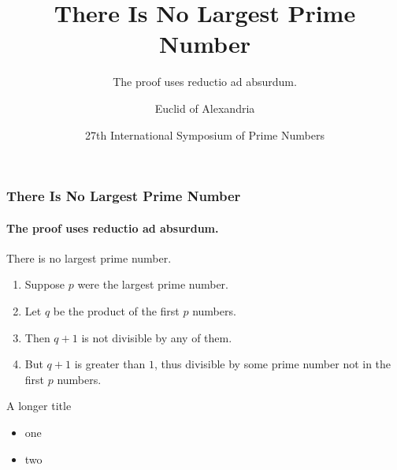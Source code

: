 \documentclass[aspectratio=169]{beamer}
\title{There Is No Largest Prime Number}
\subtitle{The proof uses reductio ad absurdum.}
\date[ISPN ’80]{27th International Symposium of Prime Numbers}
\author[Euclid]{Euclid of Alexandria}
\institute[]{}
\begin{document}
\begin{frame}
\titlepage
\end{frame}


\begin{frame} 
\frametitle{There Is No Largest Prime Number} 
\framesubtitle{The proof uses reductio ad absurdum.} 
\begin{theorem}
There is no largest prime number. \end{theorem} 
\begin{enumerate} 
\item<1-| alert@1> Suppose $p$ were the largest prime number. 
\item<2-> Let $q$ be the product of the first $p$ numbers. 
\item<3-> Then $q+1$ is not divisible by any of them. 
\item<1-> But $q + 1$ is greater than $1$, thus divisible by some prime
number not in the first $p$ numbers.
\end{enumerate}
\end{frame}

\begin{frame}{A longer title}
\begin{itemize}
\item one
\item two
\end{itemize}
\end{frame}
\end{document}
